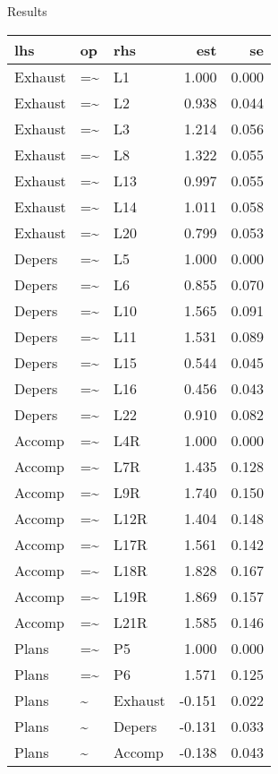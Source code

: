 \documentclass[10pt,ignorenonframetext,]{beamer}
\begin{document}
\begin{frame}{Results}

\tiny

\begin{longtable}[]{@{}lllrr@{}}
\toprule
lhs & op & rhs & est & se\tabularnewline
\midrule
\endhead
Exhaust & =\textasciitilde{} & L1 & 1.000 & 0.000\tabularnewline
Exhaust & =\textasciitilde{} & L2 & 0.938 & 0.044\tabularnewline
Exhaust & =\textasciitilde{} & L3 & 1.214 & 0.056\tabularnewline
Exhaust & =\textasciitilde{} & L8 & 1.322 & 0.055\tabularnewline
Exhaust & =\textasciitilde{} & L13 & 0.997 & 0.055\tabularnewline
Exhaust & =\textasciitilde{} & L14 & 1.011 & 0.058\tabularnewline
Exhaust & =\textasciitilde{} & L20 & 0.799 & 0.053\tabularnewline
Depers & =\textasciitilde{} & L5 & 1.000 & 0.000\tabularnewline
Depers & =\textasciitilde{} & L6 & 0.855 & 0.070\tabularnewline
Depers & =\textasciitilde{} & L10 & 1.565 & 0.091\tabularnewline
Depers & =\textasciitilde{} & L11 & 1.531 & 0.089\tabularnewline
Depers & =\textasciitilde{} & L15 & 0.544 & 0.045\tabularnewline
Depers & =\textasciitilde{} & L16 & 0.456 & 0.043\tabularnewline
Depers & =\textasciitilde{} & L22 & 0.910 & 0.082\tabularnewline
Accomp & =\textasciitilde{} & L4R & 1.000 & 0.000\tabularnewline
Accomp & =\textasciitilde{} & L7R & 1.435 & 0.128\tabularnewline
Accomp & =\textasciitilde{} & L9R & 1.740 & 0.150\tabularnewline
Accomp & =\textasciitilde{} & L12R & 1.404 & 0.148\tabularnewline
Accomp & =\textasciitilde{} & L17R & 1.561 & 0.142\tabularnewline
Accomp & =\textasciitilde{} & L18R & 1.828 & 0.167\tabularnewline
Accomp & =\textasciitilde{} & L19R & 1.869 & 0.157\tabularnewline
Accomp & =\textasciitilde{} & L21R & 1.585 & 0.146\tabularnewline
Plans & =\textasciitilde{} & P5 & 1.000 & 0.000\tabularnewline
Plans & =\textasciitilde{} & P6 & 1.571 & 0.125\tabularnewline
Plans & \textasciitilde{} & Exhaust & -0.151 & 0.022\tabularnewline
Plans & \textasciitilde{} & Depers & -0.131 & 0.033\tabularnewline
Plans & \textasciitilde{} & Accomp & -0.138 & 0.043\tabularnewline
\bottomrule
\end{longtable}

\end{frame}
\end{document}
